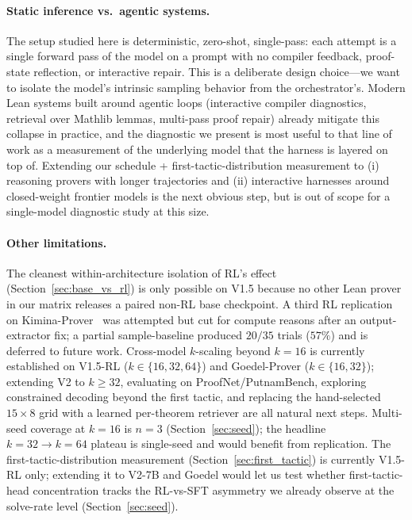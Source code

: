 \documentclass{article}
\begin{document}
\paragraph{Static inference vs.\ agentic systems.}
The setup studied here is deterministic, zero-shot, single-pass: each attempt is a single forward pass of the model on a prompt with no compiler feedback, proof-state reflection, or interactive repair. This is a deliberate design choice---we want to isolate the model's intrinsic sampling behavior from the orchestrator's. Modern Lean systems built around agentic loops (interactive compiler diagnostics, retrieval over Mathlib lemmas, multi-pass proof repair) already mitigate this collapse in practice, and the diagnostic we present is most useful to that line of work as a measurement of the underlying model that the harness is layered on top of. Extending our schedule + first-tactic-distribution measurement to (i) reasoning provers with longer trajectories and (ii) interactive harnesses around closed-weight frontier models is the next obvious step, but is out of scope for a single-model diagnostic study at this size.

\paragraph{Other limitations.}
The cleanest within-architecture isolation of RL's effect (Section~\ref{sec:base_vs_rl}) is only possible on V1.5 because no other Lean prover in our matrix releases a paired non-RL base checkpoint. A third RL replication on Kimina-Prover~\cite{wang2025kimina} was attempted but cut for compute reasons after an output-extractor fix; a partial sample-baseline produced $20/35$ trials ($57\%$) and is deferred to future work. Cross-model $k$-scaling beyond $k{=}16$ is currently established on V1.5-RL ($k \in \{16,32,64\}$) and Goedel-Prover ($k \in \{16,32\}$); extending V2 to $k \geq 32$, evaluating on ProofNet/PutnamBench, exploring constrained decoding beyond the first tactic, and replacing the hand-selected $15{\times}8$ grid with a learned per-theorem retriever are all natural next steps. Multi-seed coverage at $k{=}16$ is $n{=}3$ (Section~\ref{sec:seed}); the headline $k{=}32 \to k{=}64$ plateau is single-seed and would benefit from replication. The first-tactic-distribution measurement (Section~\ref{sec:first_tactic}) is currently V1.5-RL only; extending it to V2-7B and Goedel would let us test whether first-tactic-head concentration tracks the RL-vs-SFT asymmetry we already observe at the solve-rate level (Section~\ref{sec:seed}).
\end{document}
